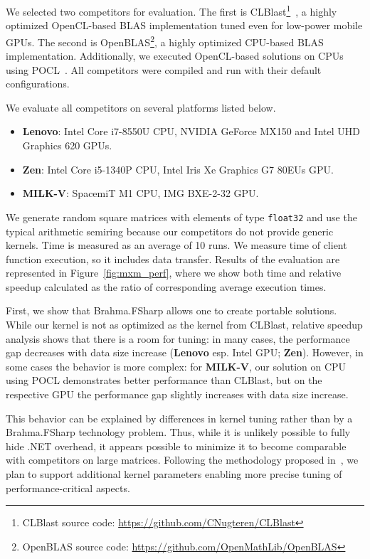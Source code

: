 We selected two competitors for evaluation. 
The first is CLBlast\footnote{CLBlast source code: \url{https://github.com/CNugteren/CLBlast}}~\cite{10.1145/3204919.3204924}, a highly optimized OpenCL-based BLAS implementation tuned even for low-power mobile GPUs.
The second is OpenBLAS\footnote{OpenBLAS source code: \url{https://github.com/OpenMathLib/OpenBLAS}}, a highly optimized CPU-based BLAS implementation.
Additionally, we executed OpenCL-based solutions on CPUs using POCL~\cite{Jskelinen2014}.
All competitors were compiled and run with their default configurations.

We evaluate all competitors on several platforms listed below.
\begin{itemize}
  \item \textbf{Lenovo}: Intel Core i7-8550U CPU, NVIDIA GeForce MX150 and Intel UHD Graphics 620 GPUs.
  \item \textbf{Zen}: Intel Core i5-1340P CPU, Intel Iris Xe Graphics G7 80EUs GPU.
  \item \textbf{MILK-V}: SpacemiT M1 CPU, IMG BXE-2-32 GPU.
\end{itemize}

We generate random square matrices with elements of type \texttt{float32} and use the typical arithmetic semiring because our competitors do not provide generic kernels.
Time is measured as an average of 10 runs.
We measure time of client function execution, so it includes data transfer.
Results of the evaluation are represented in Figure~\ref{fig:mxm_perf}, where we show both time and relative speedup calculated as the ratio of corresponding average execution times.

First, we show that Brahma.FSharp allows one to create portable solutions.
While our kernel is not as optimized as the kernel from CLBlast, relative speedup analysis shows that there is a room for tuning: in many cases, the performance gap decreases with data size increase (\textbf{Lenovo} esp. Intel GPU; \textbf{Zen}).
However, in some cases the behavior is more complex: for \textbf{MILK-V}, our solution on CPU using POCL demonstrates better performance than CLBlast, but on the respective GPU the performance gap slightly increases with data size increase.

This behavior can be explained by differences in kernel tuning rather than by a Brahma.FSharp technology problem.
Thus, while it is unlikely possible to fully hide .NET overhead, it appears possible to minimize it to become comparable with competitors on large matrices. 
Following the methodology proposed in~\cite{10.1145/3204919.3204924}, we plan to support additional kernel parameters enabling more precise tuning of performance-critical aspects.